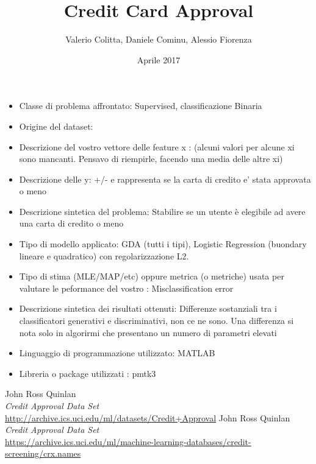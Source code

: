 \documentclass[a4paper,8pt]{article}
\begin{document}
\title{Credit Card Approval}
\author{Valerio Colitta, Daniele Cominu, Alessio Fiorenza}
\date{Aprile 2017}
\maketitle

\begin{itemize}  
\item Classe di problema affrontato: Supervised, classificazione Binaria\\
\item Origine del dataset: \cite{Dataset}
\item Descrizione del vostro vettore delle feature x : \cite{Features} (alcuni valori per alcune xi sono mancanti. Pensavo di riempirle, facendo una media delle altre xi)
\item Descrizione delle y:  +/- e rappresenta se la carta di credito e’ stata approvata o meno\\
\item Descrizione sintetica del problema: Stabilire se un utente è elegibile ad avere una carta di credito o meno\\
\item Tipo di modello applicato:  GDA (tutti i tipi), Logistic Regression (buondary lineare e quadratico) con regolarizzazione L2.\\
\item Tipo di stima (MLE/MAP/etc) oppure metrica (o metriche) usata per valutare le peformance del vostro : Misclassification error\\
\item Descrizione sintetica dei risultati ottenuti: Differenze sostanziali tra i classificatori generativi e discriminativi, non ce ne sono. Una differenza si nota solo in algorirmi che presentano un numero di parametri elevati\\
\item Linguaggio di programmazione utilizzato: MATLAB\\
\item Libreria o package utilizzati : pmtk3
\end{itemize}


\begin{thebibliography}{10}
	John Ross Quinlan \\
	\emph{Credit Approval Data Set} \\
	\url{http://archive.ics.uci.edu/ml/datasets/Credit+Approval}
	John Ross Quinlan \\
	\emph{Credit Approval Data Set} \\
	\url{ https://archive.ics.uci.edu/ml/machine-learning-databases/credit-screening/crx.names	}
\end{thebibliography}
\end{document}
